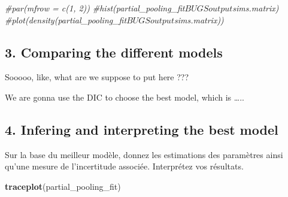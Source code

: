 \documentclass[
]{article}
\newenvironment{Shaded}{\begin{snugshade}}{\end{snugshade}}
\newcommand{\CommentTok}[1]{\textcolor[rgb]{0.56,0.35,0.01}{\textit{#1}}}
\newcommand{\FunctionTok}[1]{\textcolor[rgb]{0.13,0.29,0.53}{\textbf{#1}}}
\newcommand{\NormalTok}[1]{#1}
\begin{document}
\begin{Shaded}
\begin{Highlighting}[]
\CommentTok{\#par(mfrow = c(1, 2))}
\CommentTok{\#hist(partial\_pooling\_fit$BUGSoutput$sims.matrix)}
\CommentTok{\#plot(density(partial\_pooling\_fit$BUGSoutput$sims.matrix))}
\end{Highlighting}
\end{Shaded}

\subsection{3. Comparing the different
models}\label{comparing-the-different-models}

Sooooo, like, what are we suppose to put here ???

We are gonna use the DIC to choose the best model, which is \ldots..

\subsection{4. Infering and interpreting the best
model}\label{infering-and-interpreting-the-best-model}

Sur la base du meilleur modèle, donnez les estimations des paramètres
ainsi qu'une mesure de l'incertitude associée. Interprétez vos
résultats.

\begin{Shaded}
\begin{Highlighting}[]
\FunctionTok{traceplot}\NormalTok{(partial\_pooling\_fit)}
\end{Highlighting}
\end{Shaded}
\end{document}
